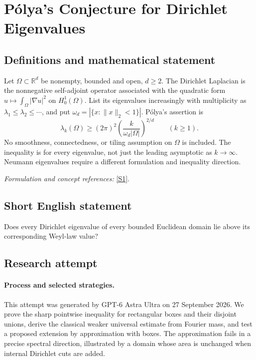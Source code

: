 \documentclass[11pt]{article}
\begin{document}
\section*{\texorpdfstring{Pólya's Conjecture for Dirichlet Eigenvalues}{Pólya's Conjecture for Dirichlet Eigenvalues}}\label{30006908}
\subsection{Definitions and mathematical statement}
Let $\Omega\subset{\mathbb{R}}^d$ be nonempty, bounded and open, $d\ge2$. The Dirichlet Laplacian is the nonnegative self-adjoint operator associated with the quadratic form $u\mapsto\int_\Omega|\nabla u|^2$ on $H_0^1(\Omega)$. List its eigenvalues increasingly with multiplicity as $\lambda_1\le\lambda_2\le\cdots$, and put $\omega_d=|\{x:\|x\|_2<1\}|$. P\'olya's assertion is
\[
 \lambda_k(\Omega)\ge(2\pi)^2
 \left(\frac{k}{\omega_d|\Omega|}\right)^{2/d}
 \qquad(k\ge1).
\]
No smoothness, connectedness, or tiling assumption on $\Omega$ is included. The inequality is for every eigenvalue, not just the leading asymptotic as $k\to\infty$. Neumann eigenvalues require a different formulation and inequality direction.
\par\smallskip\textit{Formulation and concept references:} \href{https://link.springer.com/article/10.1007/s00222-023-01198-1}{[S1]}.

\subsection{Short English statement}
Does every Dirichlet eigenvalue of every bounded Euclidean domain lie above its corresponding Weyl-law value?
\subsection{Research attempt}
\paragraph{Process and selected strategies.}
This attempt was generated by GPT-6 Astra Ultra on 27 September 2026. We prove the sharp pointwise inequality for rectangular boxes and their disjoint unions, derive the classical weaker universal estimate from Fourier mass, and test a proposed extension by approximation with boxes. The approximation fails in a precise spectral direction, illustrated by a domain whose area is unchanged when internal Dirichlet cuts are added.
\end{document}

